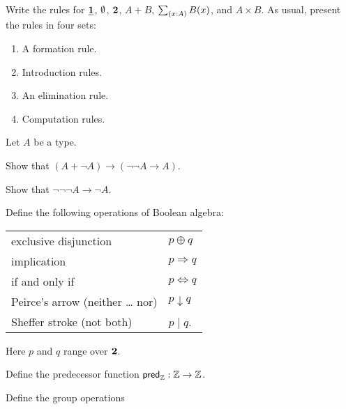 \begin{exercises}
\item
  Write the rules for $\underline{\mathbf{1}}$, $\emptyset$, $\mathbf{2}$, $A+B$, $\sm{x:A}B(x)$, and $A\times B$. As usual, present the rules in four sets:
  \begin{enumerate}
  \item A formation rule.
  \item Introduction rules.
  \item An elimination rule.
  \item Computation rules.
  \end{enumerate}
\item Let $A$ be a type.
  \begin{subexenum}
  \item Show that $(A+\neg A)\to(\neg\neg A\to A)$.
  \item Show that $\neg\neg\neg A \to \neg A$.
  \end{subexenum}
\item \label{ex:boolean-operation}Define the following operations of Boolean algebra:
  \begin{center}
    \begin{tabular}{ll}
      exclusive disjunction & $p \oplus q$ \\
      implication & $p \Rightarrow q$ \\
      if and only if & $p \Leftrightarrow q$ \\
      Peirce's arrow (neither \dots{} nor) & $p \downarrow q$ \\
      Sheffer stroke (not both) & $p\mid q$.
    \end{tabular}
  \end{center}
  Here $p$ and $q$ range over $\mathbf{2}$. 
\item \label{ex:int_pred}Define the predecessor function $\mathsf{pred}_{{\mathbb{Z}}}:{\mathbb{Z}}\to {\mathbb{Z}}$.
\item \label{ex:int_group_ops}Define the group operations

\end{exercises}
